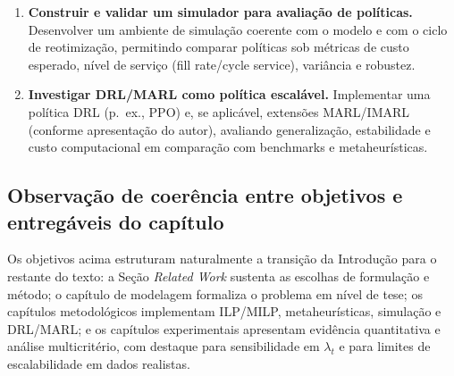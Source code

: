 \begin{enumerate}
  \item \textbf{Construir e validar um simulador para avaliação de políticas.} Desenvolver um ambiente de simulação coerente com o modelo e com o ciclo de reotimização, permitindo comparar políticas sob métricas de custo esperado, nível de serviço (fill rate/cycle service), variância e robustez. \cite{Law2015SimulationModeling}

  \item \textbf{Investigar DRL/MARL como política escalável.} Implementar uma política DRL (p.\ ex., PPO) e, se aplicável, extensões MARL/IMARL (conforme apresentação do autor), avaliando generalização, estabilidade e custo computacional em comparação com benchmarks e metaheurísticas. \cite{Boute2022DRLInventoryRoadmap,Geevers2024MEIODRL,Ziegner2025IMARL,Schulman2017PPO,Oroojlooyjadid2022BeerGameDQN}
\end{enumerate}

\subsection*{Observação de coerência entre objetivos e entregáveis do capítulo}

Os objetivos acima estruturam naturalmente a transição da Introdução para o restante do texto: a Seção \emph{Related Work} sustenta as escolhas de formulação e método; o capítulo de modelagem formaliza o problema em nível de tese; os capítulos metodológicos implementam ILP/MILP, metaheurísticas, simulação e DRL/MARL; e os capítulos experimentais apresentam evidência quantitativa e análise multicritério, com destaque para sensibilidade em \(\lambda_t\) e para limites de escalabilidade em dados realistas.

\newpage\lhead{\rightmark}


